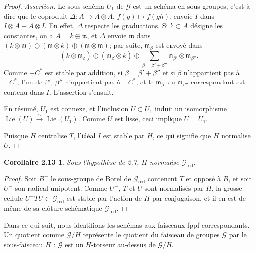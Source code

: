 \documentclass[11pt]{article}
\newcommand{\Lie}{\operatorname{Lie}}
\newcommand{\red}{\mathrm{red}}
\newtheorem*{corollaire213}{Corollaire 2.13}
\begin{document}
\begin{proof}
\emph{Assertion.} Le sous-schéma \(U_1\) de \(\mathcal G\) est un schéma en sous-groupes,
c'est-à-dire que le coproduit \(\Delta:A\to A\otimes A\), \(f(g)\mapsto f(gh)\), envoie
\(I\) dans \(I\otimes A+A\otimes I\). En effet, \(\Delta\) respecte les graduations. Si
\(k\subset A\) désigne les constantes, on a \(A=k\oplus\mathfrak m\), et \(\Delta\) envoie
\(\mathfrak m\) dans
\((k\otimes\mathfrak m)\oplus(\mathfrak m\otimes k)\oplus
(\mathfrak m\otimes\mathfrak m)\); par suite, \(\mathfrak m_\beta\) est envoyé dans
\begin{equation}
(k\otimes\mathfrak m_\beta)\oplus(\mathfrak m_\beta\otimes k)
\oplus
\sum_{\beta=\beta'+\beta''}\mathfrak m_{\beta'}\otimes\mathfrak m_{\beta''}.
\tag{2.12.3}
\end{equation}
Comme \(-C^*\) est stable par addition, si \(\beta=\beta'+\beta''\) et si \(\beta\)
n'appartient pas à \(-C^*\), l'un de \(\beta'\), \(\beta''\) n'appartient pas à
\(-C^*\), et le \(\mathfrak m_{\beta'}\) ou \(\mathfrak m_{\beta''}\) correspondant est
contenu dans \(I\). L'assertion s'ensuit.

En résumé, \(U_1\) est connexe, et l'inclusion \(U\subset U_1\) induit un isomorphisme
\(\Lie(U)\xrightarrow{\sim}\Lie(U_1)\). Comme \(U\) est lisse, ceci implique
\(U=U_1\).

Puisque \(H\) centralise \(T\), l'idéal \(I\) est stable par \(H\), ce qui signifie que
\(H\) normalise \(U\).
\end{proof}

\begin{corollaire213}
Sous l'hypothèse de 2.7, \(H\) normalise \(\mathcal G_{\red}\).
\end{corollaire213}

\begin{proof}
Soit \(B^-\) le sous-groupe de Borel de \(\mathcal G_{\red}\) contenant \(T\) et opposé
à \(B\), et soit \(U^-\) son radical unipotent. Comme \(U^-\), \(T\) et \(U\) sont
normalisés par \(H\), la grosse cellule \(U^-TU\subset\mathcal G_{\red}\) est stable
par l'action de \(H\) par conjugaison, et il en est de même de sa clôture schématique
\(\mathcal G_{\red}\).
\end{proof}

Dans ce qui suit, nous identifions les schémas aux faisceaux fppf correspondants. Un
quotient comme \(\mathcal G/H\) représente le quotient du faisceau de groupes
\(\mathcal G\) par le sous-faisceau \(H\) : \(\mathcal G\) est un \(H\)-torseur au-dessus
de \(\mathcal G/H\).
\end{document}
